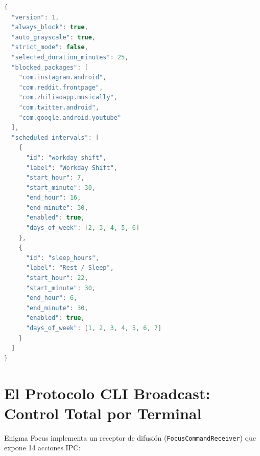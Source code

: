 \documentclass[11pt,a4paper,oneside]{report}
\begin{document}
\begin{lstlisting}[language=Kotlin, caption={Estructura del archivo de configuración declarativa JSON.}]
{
  "version": 1,
  "always_block": true,
  "auto_grayscale": true,
  "strict_mode": false,
  "selected_duration_minutes": 25,
  "blocked_packages": [
    "com.instagram.android",
    "com.reddit.frontpage",
    "com.zhiliaoapp.musically",
    "com.twitter.android",
    "com.google.android.youtube"
  ],
  "scheduled_intervals": [
    {
      "id": "workday_shift",
      "label": "Workday Shift",
      "start_hour": 7,
      "start_minute": 30,
      "end_hour": 16,
      "end_minute": 30,
      "enabled": true,
      "days_of_week": [2, 3, 4, 5, 6]
    },
    {
      "id": "sleep_hours",
      "label": "Rest / Sleep",
      "start_hour": 22,
      "start_minute": 30,
      "end_hour": 6,
      "end_minute": 30,
      "enabled": true,
      "days_of_week": [1, 2, 3, 4, 5, 6, 7]
    }
  ]
}
\end{lstlisting}

\section{El Protocolo CLI Broadcast: Control Total por Terminal}
Enigma Focus implementa un receptor de difusión (\texttt{FocusCommandReceiver}) que expone 14 acciones IPC:
\end{document}
